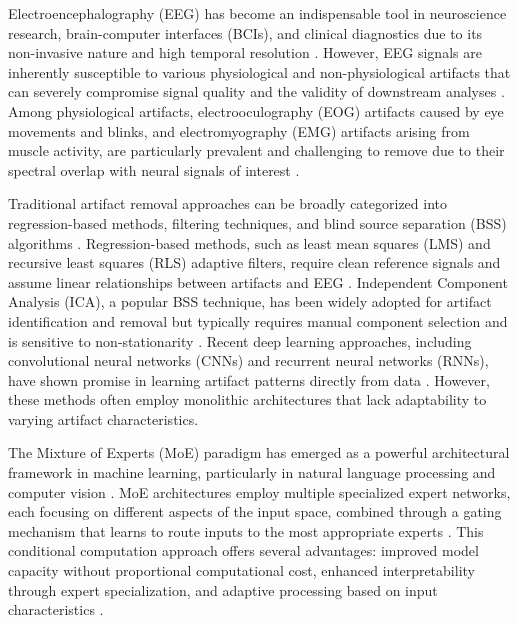 \documentclass{article}
\begin{document}
Electroencephalography (EEG) has become an indispensable tool in neuroscience research, brain-computer interfaces (BCIs), and clinical diagnostics due to its non-invasive nature and high temporal resolution \cite{teplan2002fundamentals, niedermeyer2005electroencephalography}. However, EEG signals are inherently susceptible to various physiological and non-physiological artifacts that can severely compromise signal quality and the validity of downstream analyses \cite{uriguen2015eeg}. Among physiological artifacts, electrooculography (EOG) artifacts caused by eye movements and blinks, and electromyography (EMG) artifacts arising from muscle activity, are particularly prevalent and challenging to remove due to their spectral overlap with neural signals of interest \cite{fatourechi2007emg, jiang2019removal}.

Traditional artifact removal approaches can be broadly categorized into regression-based methods, filtering techniques, and blind source separation (BSS) algorithms \cite{islam2016methods}. Regression-based methods, such as least mean squares (LMS) and recursive least squares (RLS) adaptive filters, require clean reference signals and assume linear relationships between artifacts and EEG \cite{he2004removal}. Independent Component Analysis (ICA), a popular BSS technique, has been widely adopted for artifact identification and removal but typically requires manual component selection and is sensitive to non-stationarity \cite{jung2000removing, delorme2004eeglab}. Recent deep learning approaches, including convolutional neural networks (CNNs) and recurrent neural networks (RNNs), have shown promise in learning artifact patterns directly from data \cite{yang2018automatic, zhang2021eegdenoisenet}. However, these methods often employ monolithic architectures that lack adaptability to varying artifact characteristics.

The Mixture of Experts (MoE) paradigm has emerged as a powerful architectural framework in machine learning, particularly in natural language processing and computer vision \cite{shazeer2017outrageously, fedus2022switch}. MoE architectures employ multiple specialized expert networks, each focusing on different aspects of the input space, combined through a gating mechanism that learns to route inputs to the most appropriate experts \cite{jacobs1991adaptive}. This conditional computation approach offers several advantages: improved model capacity without proportional computational cost, enhanced interpretability through expert specialization, and adaptive processing based on input characteristics \cite{riquelme2021scaling}.
\end{document}
